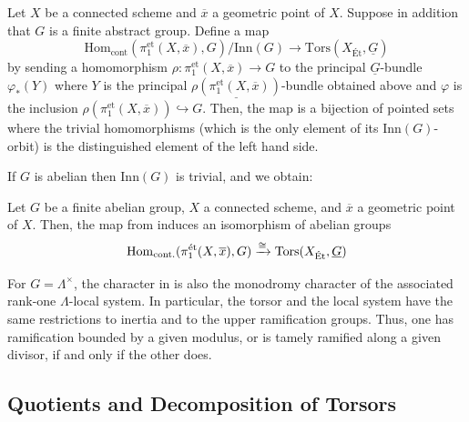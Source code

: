 \begin{theorem}\label{theorem:equivalence_fundamental_covers}
    Let $X$ be a connected scheme and $\overline{x}$ a geometric point of $X$. Suppose in addition that $G$ is a finite abstract group. 
    Define a map
    \begin{equation}
        \mathrm{Hom}_{\mathrm{cont}}(\pi_1^{\mathrm{et}}(X, \overline{x}), G) / \mathrm{Inn}(G) \to \mathrm{Tors}(X_{\text{\'Et}}, \underline{G}) 
    \end{equation}
by sending a homomorphism $\rho : \pi_1^{\mathrm{et}}(X, \overline{x}) \to G$ 
to the principal $\underline{G}$-bundle $\varphi_*(Y)$ where $Y$ is the principal $\underline{\rho(\pi_1^{\mathrm{et}}(X, \overline{x}))}$-bundle 
obtained above and $\varphi$ is the inclusion $\rho(\pi_1^{\mathrm{et}}(X, \overline{x})) \hookrightarrow G$. Then, the map 
 is a bijection of pointed sets where the trivial homomorphisms
  (which is the only element of its $\mathrm{Inn}(G)$-orbit) is the distinguished element of the left hand side.
\end{theorem}

If $G$ is abelian then $\mathrm{Inn}(G)$ is trivial, and we obtain:
\begin{cor}\label{cor:abelian_equivilance_fundamental_torsors}
    Let $G$ be a finite abelian group, $X$ a connected scheme, and $\overline{x}$ a geometric point of $X$. Then, the map from 
     induces an isomorphism of abelian groups
    \begin{equation}
        \mathrm{Hom}_{\mathrm{cont.}}(\pi_1^{\text{ét}}(X, \overline{x}), G) \xrightarrow{\cong} \operatorname{Tors}(X_{\text{\'Et}}, \underline{G})
    \end{equation}
\end{cor}

For $G=\Lambda^\times$, the character in
 is also the monodromy
character of the associated rank-one $\Lambda$-local system. In particular,
the torsor and the local system have the same restrictions to inertia and to
the upper ramification groups. Thus, one has ramification bounded by a given
modulus, or is tamely ramified along a given divisor, if and only if the other
does.

\subsection*{Quotients and Decomposition of Torsors}

